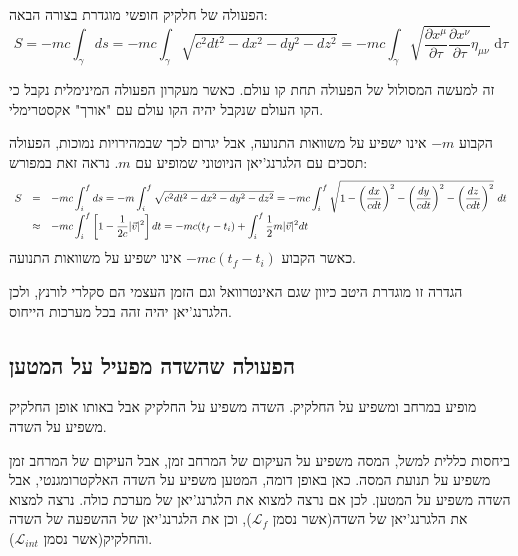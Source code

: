 \documentclass{tstextbook}
\begin{document}
\begin{definition}
הפעולה של חלקיק חופשי מוגדרת בצורה הבאה:
$$S=-mc\int_\gamma d s=-mc\int_\gamma\sqrt{c^2d t^{2}-d x^{2}-d y^{2}-d z^{2}}=-mc \int_{\gamma} \sqrt{ \frac{\partial x^\mu}{\partial \tau} \frac{\partial x^\nu}{\partial \tau} \eta_{\mu \nu} } \;\mathrm{d}\tau$$

\end{definition}
\begin{remark}
זה למעשה המסולול של הפעולה תחת קו עולם. כאשר מעקרון הפעולה המינימלית נקבל כי הקו העולם שנקבל יהיה הקו עולם עם "אורך" אקסטרימלי.

\end{remark}
הקבוע \(-m\) אינו ישפיע על משוואות התנועה, אבל יגרום לכך שבמהירויות נמוכות, הפעולה תסכים עם הלגרנג'יאן הניוטוני שמופיע עם \(m\). נראה זאת במפורש:
$$\begin{array}{r c l}{{S}}&{{=}}&{{\displaystyle-mc\int_{i}^{f}d s=-m\int_{i}^{f}\sqrt{c^2d t^{2}-d x^{2}-d y^{2}-d z^{2}}=-mc\int_{i}^{f}\sqrt{1-\left( \frac{d x}{cd t} \right)^{2}-\left( \frac{d y}{cd t} \right)^{2}-\left( \frac{d z}{cd t} \right)^{2}}~d t}}\\ {{}}&{{\approx}}&{{\displaystyle-mc\int_{i}^{f}\left[ 1-\frac{1}{2c}|\vec{v}|^{2} \right]d t=-mc(t_{f}-t_{i})+\int_{i}^{f}\frac{1}{2}m|\vec{v}|^{2}d t}}\end{array}$$
כאשר הקבוע \(-mc(t_{f}-t_{i})\) אינו ישפיע על משוואות התנועה.

\begin{remark}
הגדרה זו מוגדרת היטב כיוון שגם האינטרוואל וגם הזמן העצמי הם סקלרי לורנץ, ולכן הלגרנג'יאן יהיה זהה בכל מערכות הייחוס.

\end{remark}
\subsection{הפעולה שהשדה מפעיל על המטען}

\begin{definition}[השדה]
מופיע במרחב ומשפיע על החלקיק. השדה משפיע על החלקיק אבל באותו אופן החלקיק משפיע על השדה.

\end{definition}
ביחסות כללית למשל, המסה משפיע על העיקום של המרחב זמן, אבל העיקום של המרחב זמן משפיע על תנועת המסה.
כאן באופן דומה, המטען משפיע על השדה האלקטרומגנטי, אבל השדה משפיע על המטען. לכן אם נרצה למצוא את הלגרנג'יאן של מערכת כולה. נרצה למצוא את הלגרנג'יאן של השדה(אשר נסמן \(\mathcal{L}_{f}\)), וכן את הלגרנג'יאן של ההשפעה של השדה והחלקיק(אשר נסמן \(\mathcal{L}_{int}\)).
\end{document}
